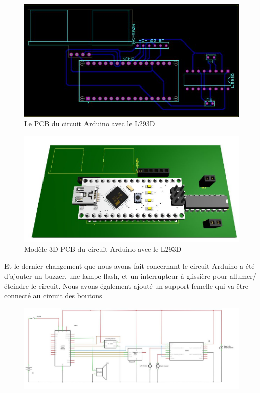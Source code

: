 \begin{figure}[!htbp]
    \centering
    \includegraphics[width=.7\textwidth]{assets/conception1/img57.jpg}
    \caption{Le PCB du circuit Arduino avec le L293D}
\end{figure}

\begin{figure}[!htbp]
    \centering
    \includegraphics[width=.7\textwidth]{assets/conception1/img58.jpg}
    \caption{Modèle 3D PCB du circuit Arduino avec le L293D}
\end{figure}

\FloatBarrier

Et le dernier changement que nous avons fait concernant le circuit Arduino a été d’ajouter un buzzer, une lampe flash, et un interrupteur à glissière pour allumer/éteindre le circuit.
Nous avons également ajouté un support femelle qui va être connecté au circuit des boutons 

\begin{figure}[!htbp]
    \centering
    \includegraphics[width=\textwidth]{assets/conception1/img61.jpg}
\end{figure}

